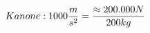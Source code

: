 \documentclass[preview]{standalone}
\begin{document}
\begin{align*}
\special{dvisvgm:raw <g id='unique000'>}Kanone: 1000 \frac{m}{s^{2}} = \frac{\approx 200.000 N}{200 kg}\special{dvisvgm:raw </g>}
\end{align*}
\end{document}
